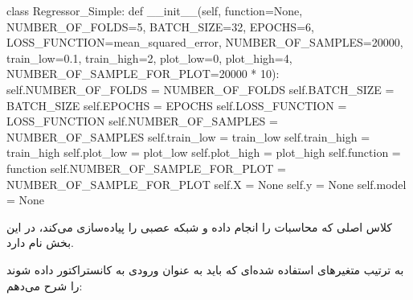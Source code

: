 \documentclass[12pt,titlepage,a4page , tikz , multi,table , svgnames,xcdraw]{article}
\begin{document}
\begin{latin}
\begin{python}[language=Python]
class Regressor_Simple:
    def __init__(self, function=None, NUMBER_OF_FOLDS=5,
     BATCH_SIZE=32, EPOCHS=6,
                 LOSS_FUNCTION=mean_squared_error,
                  NUMBER_OF_SAMPLES=20000,
                 train_low=0.1, train_high=2, plot_low=0,
                  plot_high=4,
                   NUMBER_OF_SAMPLE_FOR_PLOT=20000 * 10):
        self.NUMBER_OF_FOLDS = NUMBER_OF_FOLDS
        self.BATCH_SIZE = BATCH_SIZE
        self.EPOCHS = EPOCHS
        self.LOSS_FUNCTION = LOSS_FUNCTION
        self.NUMBER_OF_SAMPLES = NUMBER_OF_SAMPLES
        self.train_low = train_low
        self.train_high = train_high
        self.plot_low = plot_low
        self.plot_high = plot_high
        self.function = function
        self.NUMBER_OF_SAMPLE_FOR_PLOT = NUMBER_OF_SAMPLE_FOR_PLOT
        self.X = None
        self.y = None
        self.model = None

\end{python}

\end{latin}

کلاس اصلی که محاسبات را انجام داده و شبکه عصبی را پیاده‌سازی می‌کند، در این بخش  نام دارد.

به ترتیب متغیرهای استفاده شده‌ای که باید به عنوان ورودی به کانستراکتور داده شوند را شرح می‌دهم:
\end{document}
